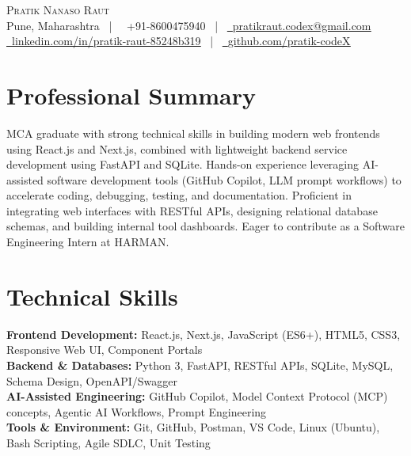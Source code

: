 \documentclass[letterpaper,11pt]{article}
\newcommand{\faPhone}{}
\newcommand{\faEnvelope}{}
\newcommand{\faLinkedin}{}
\newcommand{\faGithub}{}
\begin{document}
\begin{center}
    {\Huge \scshape Pratik Nanaso Raut} \\ \vspace{2pt}
    \small Pune, Maharashtra ~|~
    \faPhone\ +91-8600475940 ~|~
    \href{mailto:pratikraut.codex@gmail.com}{\faEnvelope\ \underline{pratikraut.codex@gmail.com}} \\ \vspace{2pt}
    \href{https://linkedin.com/in/pratik-raut-85248b319}{\faLinkedin\ \underline{linkedin.com/in/pratik-raut-85248b319}} ~|~
    \href{https://github.com/pratik-codeX}{\faGithub\ \underline{github.com/pratik-codeX}}
\end{center}

\vspace{-6pt}

\section{Professional Summary}
MCA graduate with strong technical skills in building modern web frontends using React.js and Next.js, combined with lightweight backend service development using FastAPI and SQLite. Hands-on experience leveraging AI-assisted software development tools (GitHub Copilot, LLM prompt workflows) to accelerate coding, debugging, testing, and documentation. Proficient in integrating web interfaces with RESTful APIs, designing relational database schemas, and building internal tool dashboards. Eager to contribute as a Software Engineering Intern at HARMAN.

\section{Technical Skills}
\vspace{1pt}
\textbf{Frontend Development:} React.js, Next.js, JavaScript (ES6+), HTML5, CSS3, Responsive Web UI, Component Portals \\[1.5pt]
\textbf{Backend \& Databases:} Python 3, FastAPI, RESTful APIs, SQLite, MySQL, Schema Design, OpenAPI/Swagger \\[1.5pt]
\textbf{AI-Assisted Engineering:} GitHub Copilot, Model Context Protocol (MCP) concepts, Agentic AI Workflows, Prompt Engineering \\[1.5pt]
\textbf{Tools \& Environment:} Git, GitHub, Postman, VS Code, Linux (Ubuntu), Bash Scripting, Agile SDLC, Unit Testing
\vspace{-2pt}
\end{document}
